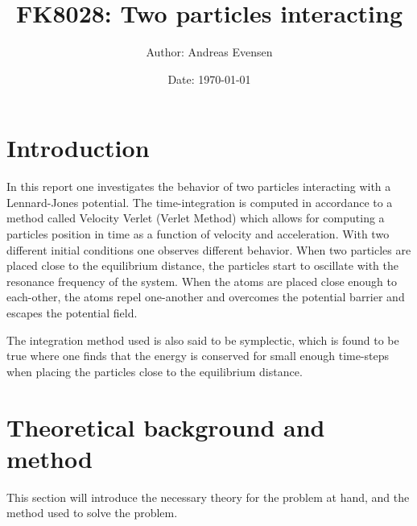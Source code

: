 \documentclass[a4paper]{article}
\title{FK8028: Two particles interacting}
\author{Author: Andreas Evensen}
\date{Date: \today}
\newcommand{\newparagraph}{\vspace{.5cm}\noindent}
\begin{document}

\newpage
{}
\setcounter{page}{1}
\newpage
\tableofcontents
\newpage
{}
\section{Introduction}
In this report one investigates the behavior of two particles interacting with a Lennard-Jones potential. The time-integration is computed in accordance to a method called Velocity Verlet (Verlet Method) which allows for computing a particles position in time as a function of velocity and acceleration.
With two different initial conditions one observes different behavior. When two particles are placed close to the equilibrium distance, the particles start to oscillate with the resonance frequency of the system. 
When the atoms are placed close enough to each-other, the atoms repel one-another and overcomes the potential barrier and escapes the potential field.

\newparagraph
The integration method used is also said to be symplectic, which is found to be true where one finds that the energy is conserved for small enough time-steps when placing the particles close to the equilibrium distance. 


\section{Theoretical background and method}
This section will introduce the necessary theory for the problem at hand, and the method used to solve the problem.
\end{document}

